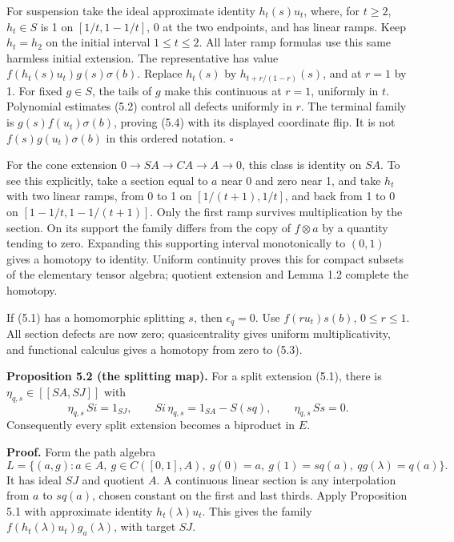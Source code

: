\documentclass[
  11pt,
]{article}
\begin{document}
For suspension take the ideal approximate identity \(h_t(s)u_t\), where,
for \(t\geq2\), \(h_t\in S\) is 1 on \([1/t,1-1/t]\), 0 at the two
endpoints, and has linear ramps. Keep \(h_t=h_2\) on the initial
interval \(1\leq t\leq2\). All later ramp formulas use this same
harmless initial extension. The representative has value
\(f(h_t(s)u_t)g(s)\sigma(b)\). Replace \(h_t(s)\) by
\(h_{t+r/(1-r)}(s)\), and at \(r=1\) by 1. For fixed \(g\in S\), the
tails of \(g\) make this continuous at \(r=1\), uniformly in \(t\).
Polynomial estimates (5.2) control all defects uniformly in \(r\). The
terminal family is \(g(s)f(u_t)\sigma(b)\), proving (5.4) with its
displayed coordinate flip. It is not \(f(s)g(u_t)\sigma(b)\) in this
ordered notation. \(\square\)

For the cone extension \(0\to SA\to CA\to A\to0\), this class is
identity on \(SA\). To see this explicitly, take a section equal to
\(a\) near 0 and zero near 1, and take \(h_t\) with two linear ramps,
from 0 to 1 on \([1/(t+1),1/t]\), and back from 1 to 0 on
\([1-1/t,1-1/(t+1)]\). Only the first ramp survives multiplication by
the section. On its support the family differs from the copy of
\(f\otimes a\) by a quantity tending to zero. Expanding this supporting
interval monotonically to \((0,1)\) gives a homotopy to identity.
Uniform continuity proves this for compact subsets of the elementary
tensor algebra; quotient extension and Lemma 1.2 complete the homotopy.

If (5.1) has a homomorphic splitting \(s\), then \(\epsilon_q=0\). Use
\(f(ru_t)s(b)\), \(0\leq r\leq1\). All section defects are now zero;
quasicentrality gives uniform multiplicativity, and functional calculus
gives a homotopy from zero to (5.3).

\textbf{Proposition 5.2 (the splitting map).} For a split extension
(5.1), there is \(\eta_{q,s}\in[[SA,SJ]]\) with \[
\eta_{q,s}\,Si=1_{SJ},\qquad
Si\,\eta_{q,s}=1_{SA}-S(sq),\qquad
\eta_{q,s}\,Ss=0.
\tag{5.5}
\] Consequently every split extension becomes a biproduct in \(E\).

\textbf{Proof.} Form the path algebra \[
L=\{(a,g):a\in A,\ g\in C([0,1],A),\
g(0)=a,\ g(1)=sq(a),\ qg(\lambda)=q(a)\}.
\tag{5.6}
\] It has ideal \(SJ\) and quotient \(A\). A continuous linear section
is any interpolation from \(a\) to \(sq(a)\), chosen constant on the
first and last thirds. Apply Proposition 5.1 with approximate identity
\(h_t(\lambda)u_t\). This gives the family
\(f(h_t(\lambda)u_t)g_a(\lambda)\), with target \(SJ\).
\end{document}
